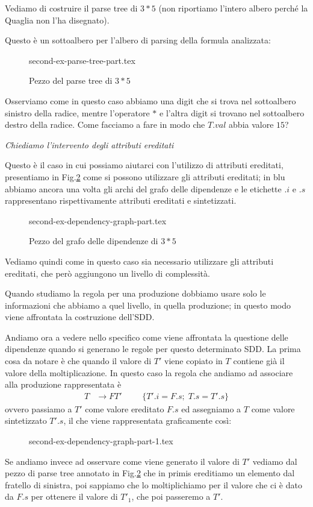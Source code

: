 \documentclass[class=book, crop=false, oneside, 12pt]{standalone}
\begin{document}
Vediamo di costruire il parse tree di \(3*5\) (non riportiamo l'intero albero perché la Quaglia non l'ha disegnato).

Questo è un sottoalbero per l'albero di parsing della formula analizzata:
\begin{figure}[H]
    \centering
    {second-ex-parse-tree-part.tex}
    \caption{Pezzo del parse tree di \(3*5\)}
    \label{fig:second-ex-parse-tree-part}
\end{figure}
Osserviamo come in questo caso abbiamo una digit che si trova nel sottoalbero sinistro della radice, mentre l'operatore \(*\) e l'altra digit si trovano nel sottoalbero destro della radice.
Come facciamo a fare in modo che \(T.val\) abbia valore \(15\)?

\noindent \emph{Chiediamo l'intervento degli attributi ereditati}

\noindent Questo è il caso in cui possiamo aiutarci con l'utilizzo di attributi ereditati, presentiamo in Fig.\ref{fig:second-ex-dependency-graph-part} come si possono utilizzare gli attributi ereditati; in blu abbiamo ancora una volta gli archi del grafo delle dipendenze e le etichette \(.i\) e \(.s\) rappresentano rispettivamente attributi ereditati e sintetizzati.
\begin{figure}[H]
    \centering
    {second-ex-dependency-graph-part.tex}
    \caption{Pezzo del grafo delle dipendenze di \(3*5\)}
    \label{fig:second-ex-dependency-graph-part}
\end{figure}
Vediamo quindi come in questo caso sia necessario utilizzare gli attributi ereditati, che però aggiungono un livello di complessità.

Quando studiamo la regola per una produzione dobbiamo usare solo le informazioni che abbiamo a quel livello, in quella produzione; in questo modo viene affrontata la costruzione dell'SDD.

Andiamo ora a vedere nello specifico come viene affrontata la questione delle dipendenze quando si generano le regole per questo determinato SDD.
La prima cosa da notare è che quando il valore di \(T'\) viene copiato in \(T\) contiene già il valore della moltiplicazione.
In questo caso la regola che andiamo ad associare alla produzione rappresentata è
\begin{align*}
    T &\to FT' & & &\{T'.i = F.s; \; T.s = T'.s\}
\end{align*}
ovvero passiamo a \(T'\) come valore ereditato \(F.s\) ed assegniamo a \(T\) come valore sintetizzato \(T'.s\), il che viene rappresentata graficamente così:
\begin{figure}[H]
    \centering
    {second-ex-dependency-graph-part-1.tex}
\end{figure}
Se andiamo invece ad osservare come viene generato il valore di \(T'\) vediamo dal pezzo di parse tree annotato in Fig.\ref{fig:second-ex-dependency-graph-part} che in primis ereditiamo un elemento dal fratello di sinistra, poi sappiamo che lo moltiplichiamo per il valore che ci è dato da \(F.s\) per ottenere il valore di \(T'_1\), che poi passeremo a \(T'\).
\end{document}
